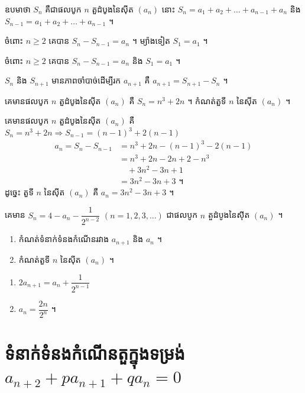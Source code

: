 ឧបមាថា $S_n$ គឺជាផលបូក $n$ តួដំបូងនៃស៊ីត $(a_n)$ នោះ $S_n = a_1 + a_2 + \ldots + a_{n-1} + a_n$ និង $S_{n-1} = a_1 + a_2 + \ldots + a_{n-1}$ ។

ចំពោះ $n \ge 2$ គេបាន $S_n - S_{n-1} = a_n$ ។ ម្យ៉ាងទៀត $S_1 = a_1$ ។

\begin{formulaBox}[ជាទូទៅ]
ចំពោះ $n \ge 2$ គេបាន $S_n - S_{n-1} = a_n$ និង $S_1 = a_1$ ។
\end{formulaBox}

\begin{note}
$S_n$ និង $S_{n+1}$ មានភាពចាំបាច់ដើម្បីរក $a_{n+1}$ គឺ $a_{n+1} = S_{n+1} - S_n$ ។
\end{note}

\begin{example}[លំហាត់គំរូ]
គេមានផលបូក $n$ តួដំបូងនៃស៊ីត $(a_n)$ គឺ $S_n = n^3 + 2n$ ។ កំណត់តួទី $n$ នៃស៊ីត $(a_n)$ ។
\end{example}
\ans
គេមានផលបូក $n$ តួដំបូងនៃស៊ីត $(a_n)$ គឺ $S_n = n^3 + 2n \Rightarrow S_{n-1} = (n - 1)^3 + 2(n - 1)$
\[
\begin{aligned}
a_n = S_n - S_{n-1} &= n^3 + 2n - (n - 1)^3 - 2(n - 1)\\
&= n^3 + 2n - 2n + 2 - n^3\\
&\quad + 3n^2 - 3n + 1\\
&= 3n^2 - 3n + 3 \text{ ។}
\end{aligned}
\]
ដូច្នេះ តួទី $n$ នៃស៊ីត $(a_n)$ គឺ $a_n = 3n^2 - 3n + 3$ ។

\begin{pro}
គេមាន $S_n = 4 - a_n - \dfrac{1}{2^{n-2}}$ $(n = 1, 2, 3, \ldots)$ ជាផលបូក $n$ តួដំបូងនៃស៊ីត $(a_n)$ ។
\begin{enumerate}[a]
  \item កំណត់ទំនាក់ទំនងកំណើនរវាង $a_{n+1}$ និង $a_n$ ។
  \item កំណត់តួទី $n$ នៃស៊ីត $(a_n)$ ។
\end{enumerate}
\ans
\begin{enumerate}[a]
  \item $2a_{n+1} = a_n + \dfrac{1}{2^{n-1}}$
  \item $a_n = \dfrac{2n}{2^n}$ ។
\end{enumerate}
\end{pro}

\section{ទំនាក់ទំនងកំណើនតួក្នុងទម្រង់ \texorpdfstring{$a_{n+2} + pa_{n+1} + qa_n = 0$}{a(n+2)+pa(n+1)+qa(n)=0}}


